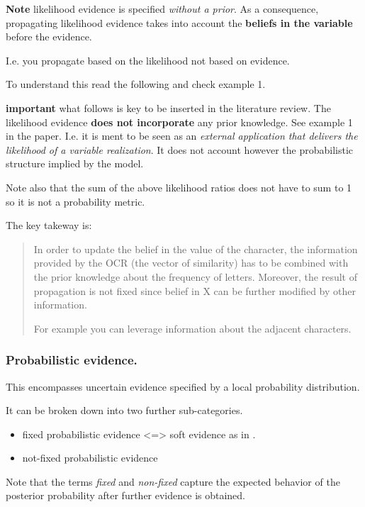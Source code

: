 \documentclass[a4paper]{article}
\begin{document}
\textbf{Note} likelihood evidence is specified \emph{without a prior}. As a
consequence, propagating likelihood evidence takes into account
the \textbf{beliefs in the variable}  before the evidence. 

I.e. you propagate based on the likelihood not based on evidence.

To understand this read the following and check example 1.

\textbf{important} what follows is key to be inserted in the literature
review. The likelihood evidence \textbf{does not incorporate} any prior
knowledge. See example 1 in the paper. I.e. it is ment to be seen
as an \emph{external application that delivers the likelihood of a
variable realization}.  It does not account however the
probabilistic structure implied by the model.

Note also that the sum of the above likelihood ratios does not
have to sum to 1 so it is not a probability metric.

The key takeway is:

\begin{quote}
In order to update the belief in the value of the character, the
information provided by the OCR (the vector of similarity) has to be
combined with the prior knowledge about the frequency of
letters. Moreover, the result of propagation is not fixed since belief
in X can be further modified by other information.

For example you can leverage information about the adjacent characters.
\end{quote}


\subsubsection{Probabilistic evidence.}
\label{sec:orgf01b4ae}

This encompasses uncertain evidence specified by a local
probability distribution.

It can be broken down into two further sub-categories.

\begin{itemize}
\item fixed probabilistic evidence <=> soft evidence as in \cite{Valtorta_2002}.

\item not-fixed probabilistic evidence
\end{itemize}

Note that the terms \emph{fixed} and \emph{non-fixed} capture the expected
behavior of the posterior probability after further evidence is
obtained.
\end{document}
